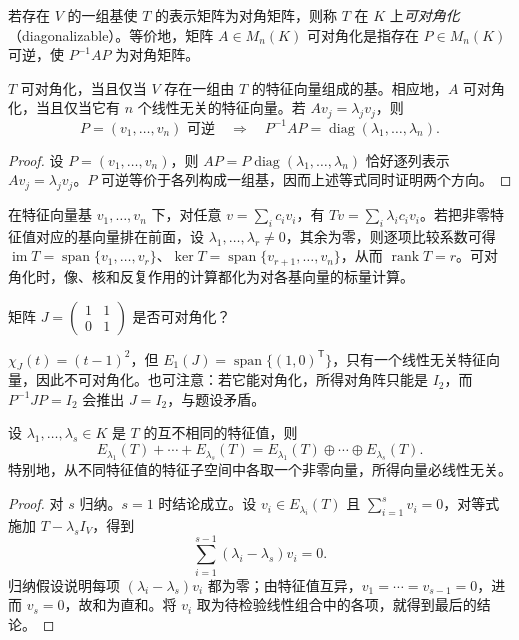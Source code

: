\begin{definition}
\label{def:xie-diagonalizable}
若存在 $V$ 的一组基使 $T$ 的表示矩阵为对角矩阵，则称 $T$ 在 $K$ 上\emph{可对角化}（diagonalizable）。等价地，矩阵 $A\in M_n(K)$ 可对角化是指存在 $P\in M_n(K)$ 可逆，使 $P^{-1}AP$ 为对角矩阵。
\end{definition}

\begin{theorem}[特征向量基判据]
\label{thm:xie-eigenbasis}
$T$ 可对角化，当且仅当 $V$ 存在一组由 $T$ 的特征向量组成的基。相应地，$A$ 可对角化，当且仅当它有 $n$ 个线性无关的特征向量。若 $Av_j=\lambda_jv_j$，则
\begin{equation}
\label{eq:xie-diagonalizer}
 P=(v_1,\ldots,v_n)\text{ 可逆}
 \quad\Longrightarrow\quad
 P^{-1}AP=\operatorname{diag}(\lambda_1,\ldots,\lambda_n).
\end{equation}
\end{theorem}
\begin{proof}
设 $P=(v_1,\ldots,v_n)$，则 $AP=P\operatorname{diag}(\lambda_1,\ldots,\lambda_n)$ 恰好逐列表示 $Av_j=\lambda_jv_j$。$P$ 可逆等价于各列构成一组基，因而上述等式同时证明两个方向。
\end{proof}

在特征向量基 $v_1,\ldots,v_n$ 下，对任意 $v=\sum_i c_iv_i$，有 $Tv=\sum_i\lambda_ic_iv_i$。若把非零特征值对应的基向量排在前面，设 $\lambda_1,\ldots,\lambda_r\ne0$，其余为零，则逐项比较系数可得 $\operatorname{im}T=\operatorname{span}\{v_1,\ldots,v_r\}$、$\ker T=\operatorname{span}\{v_{r+1},\ldots,v_n\}$，从而 $\operatorname{rank}T=r$。可对角化时，像、核和反复作用的计算都化为对各基向量的标量计算。

\begin{example}
\label{ex:xie-jordan-two}
矩阵 $J=\begin{pmatrix}1&1\\0&1\end{pmatrix}$ 是否可对角化？
\end{example}
\begin{solve}
$\chi_J(t)=(t-1)^2$，但 $E_1(J)=\operatorname{span}\{(1,0)^{\mathsf T}\}$，只有一个线性无关特征向量，因此不可对角化。也可注意：若它能对角化，所得对角阵只能是 $I_2$，而 $P^{-1}JP=I_2$ 会推出 $J=I_2$，与题设矛盾。
\end{solve}

\begin{theorem}[不同特征子空间之和为直和]
\label{thm:xie-eigenspaces-direct}
设 $\lambda_1,\ldots,\lambda_s\in K$ 是 $T$ 的互不相同的特征值，则
\[
 E_{\lambda_1}(T)+\cdots+E_{\lambda_s}(T)
 =E_{\lambda_1}(T)\oplus\cdots\oplus E_{\lambda_s}(T).
\]
特别地，从不同特征值的特征子空间中各取一个非零向量，所得向量必线性无关。
\end{theorem}
\begin{proof}
对 $s$ 归纳。$s=1$ 时结论成立。设 $v_i\in E_{\lambda_i}(T)$ 且 $\sum_{i=1}^s v_i=0$，对等式施加 $T-\lambda_sI_V$，得到
\[
 \sum_{i=1}^{s-1}(\lambda_i-\lambda_s)v_i=0.
\]
归纳假设说明每项 $(\lambda_i-\lambda_s)v_i$ 都为零；由特征值互异，$v_1=\cdots=v_{s-1}=0$，进而 $v_s=0$，故和为直和。将 $v_i$ 取为待检验线性组合中的各项，就得到最后的结论。
\end{proof}

